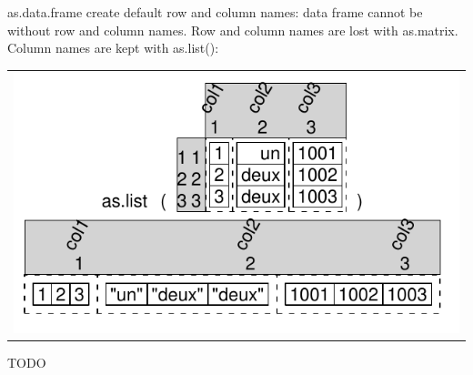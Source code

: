 \documentclass[pdflatex]{article}
\begin{document}
as.data.frame create default row and column names: data frame cannot be without
row and column names. Row and column names are lost with as.matrix. Column names are kept with as.list():

\begin{tabular}{c}
\includegraphics{dataframe_as_list}
\end{tabular}



%
% 


TODO

% 
% 
% 
% 
% 
% 
% 
% 
% 
% 
\end{document}
